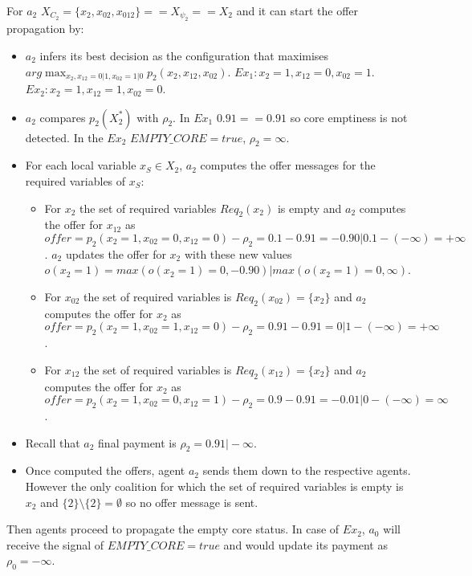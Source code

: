 \documentclass{article}
\begin{document}
For $a_2$ $X_{C_2}=\{x_2,x_{02},x_{012}\}==X_{\psi_2}==X_2$ and it can start the
offer propagation by:
\begin{itemize}
  \item $a_2$ infers its best decision as the configuration that maximises
  \break$arg \max_{x_2,x_{12}=0\vert 1,x_{02}=1\vert 0} p_2(x_2,x_{12},x_{02})$.
  $Ex_1:x_2=1,x_{12}=0,x_{02}=1$. $Ex_2:x_2=1,x_{12}=1,x_{02}=0$.
  \item $a_2$ compares $p_2(X^*_2)$ with $\rho_2$. In $Ex_1$ $0.91==0.91$ so
  core emptiness is not detected. In the $Ex_2$ $EMPTY\_CORE = true$, $\rho_2=\infty$.
  \item For each local variable $x_S\in X_2$, $a_2$ computes the offer messages
  for the required variables of $x_S$:
  \begin{itemize}
    \item For $x_2$ the set of required variables $Req_2(x_2)$ is empty and
    $a_2$ computes the offer for $x_{12}$ as $offer=
    p_2(x_2=1,x_{02}=0,x_{12}=0)-\rho_2= 0.1 -0.91=-0.90 \vert 0.1
    -(-\infty)=+\infty$. $a_2$ updates the offer for $x_2$ with these new values
    $o(x_2=1)= max(o(x_2=1)=0,-0.90)\vert max(o(x_2=1)=0,\infty)$.
    \item For $x_{02}$ the set of required variables is $Req_2(x_{02})=\{x_2\}$
    and $a_2$ computes the offer for $x_2$ as $offer=
    p_2(x_2=1,x_{02}=1,x_{12}=0)-\rho_2= 0.91-0.91=0\vert 1 -(-\infty)=+\infty$.
    \item For $x_{12}$ the set of required variables is $Req_2(x_{12})
    =\{x_2\}$ and $a_2$ computes the offer for $x_2$ as $offer=
    p_2(x_2=1,x_{02}=0,x_{12}=1)-\rho_2= 0.9-0.91=-0.01\vert 0-(-\infty)=\infty$.
  \end{itemize}
  \item Recall that $a_2$ final payment is $\rho_2=0.91\vert -\infty$.
  \item Once computed the offers, agent $a_2$ sends them down to the respective
  agents. However the only coalition for which the set of required variables is
  empty is $x_2$ and $\{2\}\setminus\{2\}=\emptyset$ so no offer message is
  sent.
\end{itemize}


Then agents proceed to propagate the empty core status. In case of $Ex_2$, $a_0$
will receive the signal of $EMPTY\_CORE= true$ and would update its payment as
$\rho_0=-\infty$.
\end{document}
